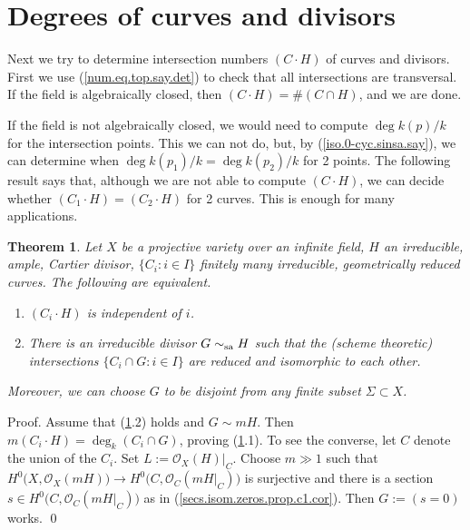 \documentclass{amsart}
\newtheorem{thm}{Theorem}%
\theoremstyle{definition}
\theoremstyle{remark}
\renewcommand{\o}[0]{{\mathcal O}}
\newcommand{\simsa}[0]{\sim_{\rm sa}}
\begin{document}
\section{Degrees of curves and divisors}


Next we try to determine intersection numbers $(C\cdot H)$ of curves and divisors. First we use  
(\ref{num.eq.top.say.det}) to check that all 
intersections  are transversal. 
If the field is algebraically closed,  then $(C\cdot H)=\# (C\cap H)$, and we are done. 

If the field is not algebraically closed, we would need to compute
$\deg k(p)/k$ for the intersection points. This we can not do, but, by
(\ref{iso.0-cyc.sinsa.say}),   we can determine when $\deg k(p_1)/k=\deg k(p_2)/k$ for 2 points. 
The following result says that, although  we are not  able to compute
$(C\cdot H)$, we can decide whether $(C_1\cdot H)=(C_2\cdot H)$ for 2  curves. This is enough for many applications. 


\begin{thm} \label{secs.isom.zeros.prop.c1}
Let $X$ be a projective variety over an infinite field, $H$ an irreducible, ample, Cartier divisor,  $\{C_i:i\in I\}$ finitely many irreducible, geometrically reduced  curves. The following are equivalent.
\begin{enumerate}
\item  $(C_i\cdot H)$ is independent of $i$. 
\item There is an     irreducible divisor
$G\simsa H$ such that the (scheme theoretic) intersections
$\{C_i\cap G :i\in I\}$ are reduced and  isomorphic to each other. 
\end{enumerate}
Moreover, we can choose $G$ to be   disjoint from any finite subset  $\Sigma\subset X$.
\end{thm}




Proof. Assume that (\ref{secs.isom.zeros.prop.c1}.2)  holds and $G\sim mH$.
Then  $m(C_i\cdot H)=\deg_k (C_i\cap G )$, proving (\ref{secs.isom.zeros.prop.c1}.1).  To see the converse, let $C$ denote the union of the $C_i$. 
Set $L:=\o_X(H)|_C$.
Choose $m\gg 1$ such that  $H^0\bigl(X, \o_X(mH)\bigr)\to  H^0\bigl(C, \o_C(mH|_C)\bigr)$ is surjective and 
 there is a section $s\in H^0\bigl(C, \o_C(mH|_C)\bigr)$ as in (\ref{secs.isom.zeros.prop.c1.cor}). Then  $G:=(s=0)$ works.  \qed
\end{document}
